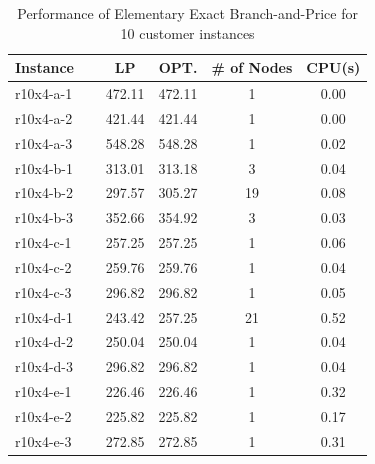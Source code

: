 \documentclass[graybox]{./styles/svmult}
\begin{document}
\begin{table}[ht]
\centering
\caption{Performance of Elementary Exact Branch-and-Price for 10 customer instances}\label{gr1-10}
\begin {tabular}[t]{|l|c|c|c|c|}  
\hline
Instance & LP & OPT. & \# of Nodes & CPU(s) \\\hline
r10x4-a-1 \ \	&	472.11	&	472.11	&	1	&	0.00	\\
r10x4-a-2 \ \	&	421.44	&	421.44	&	1	&	0.00	\\
r10x4-a-3 \ \	&	548.28	&	548.28	&	1	&	0.02	\\
r10x4-b-1 \ \	&	313.01	&	313.18	&	3	&	0.04	\\
r10x4-b-2 \ \	&	297.57	&	305.27	&	19	&	0.08	\\
r10x4-b-3 \ \	&	352.66	&	354.92	&	3	&	0.03	\\
r10x4-c-1 \ \	&	257.25	&	257.25	&	1	&	0.06	\\
r10x4-c-2 \ \	&	259.76	&	259.76	&	1	&	0.04	\\
r10x4-c-3 \ \	&	296.82	&	296.82	&	1	&	0.05	\\
r10x4-d-1 \ \	&	243.42	&	257.25	&	21	&	0.52	\\
r10x4-d-2 \ \	&	250.04	&	250.04	&	1	&	0.04	\\
r10x4-d-3 \ \	&	296.82	&	296.82	&	1	&	0.04	\\
r10x4-e-1 \ \	&	226.46	&	226.46	&	1	&	0.32	\\
r10x4-e-2 \ \	&	225.82	&	225.82	&	1	&	0.17	\\
r10x4-e-3 \ \	&	272.85	&	272.85	&	1       &	0.31	\\
\hline
\end{tabular}
\end{table} 
\end{document}

